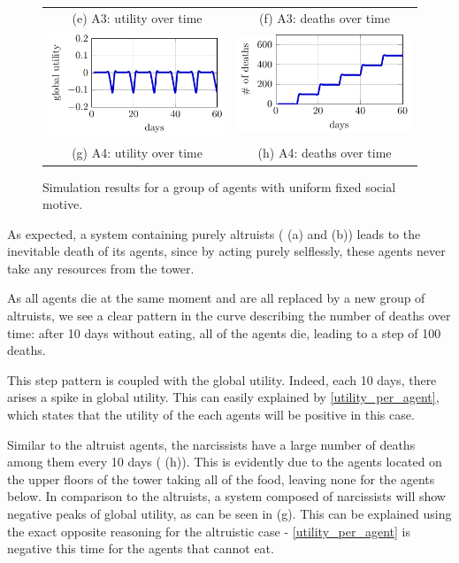 \begin{figure}[htb]
\begin{tabular}{cc}
    (e) A3: utility over time & (f) A3: deaths over time
    \\[8pt]
     \includegraphics[width=0.3\linewidth]{008_team_6_agent_design/A/SOMAS_A4_utility.pdf} &   \includegraphics[width=0.3\linewidth]{008_team_6_agent_design/A/SOMAS_A4_deaths.pdf} \\[0pt]
    (g) A4: utility over time & (h) A4: deaths over time
    \end{tabular}
    \caption{Simulation results for a group of agents with uniform fixed social motive.}
    \label{fig:res_A}%
\end{figure}



As expected, a system containing purely altruists ( (a) and (b)) leads to the inevitable death of its agents, since by acting purely selflessly, these agents never take any resources from the tower.

As all agents die at the same moment and are all replaced by a new group of altruists, we see a clear pattern in the curve describing the number of deaths over time: after 10 days without eating, all of the agents die, leading to a step of 100 deaths. 

This step pattern is coupled with the global utility. Indeed, each 10 days, there arises a spike in global utility. This can easily explained by \eqref{utility_per_agent}, which states that the utility of the each agents will be positive in this case.

Similar to the altruist agents, the narcissists have a large number of deaths among them every 10 days ( (h)). This is evidently due to the agents located on the upper floors of the tower taking all of the food, leaving none for the agents below. In comparison to the altruists, a system composed of narcissists will show negative peaks of global utility, as can be seen in  (g). This can be explained using the exact opposite reasoning for the altruistic case - \eqref{utility_per_agent} is negative this time for the agents that cannot eat.

